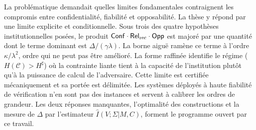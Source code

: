 \begin{sloppypar}
La probl\'ematique demandait quelles limites fondamentales contraignent les compromis entre
confidentialit\'e, fiabilit\'e et opposabilit\'e. La th\`ese y r\'epond par une limite explicite
et conditionnelle. Sous trois des quatre hypoth\`eses institutionnelles pos\'ees, le produit
$\mathsf{Conf} \cdot \mathsf{Rel}_{\mathrm{rec}} \cdot \mathsf{Opp}$ est major\'e par une quantit\'e dont le terme dominant est
$\Delta/(\gamma\lambda)$. La borne aigu\"e ram\`ene ce terme \`a l'ordre $\kappa/\lambda^2$, ordre
qui ne peut pas \^etre am\'elior\'e. La forme raffin\'ee identifie le r\'egime
($H(\mathcal{C}) > H^\sharp$) o\`u la contrainte liante tient \`a la capacit\'e de l'institution plut\^ot qu'\`a la puissance de calcul
de l'adversaire. Cette limite est certifi\'ee m\'ecaniquement et sa
port\'ee est d\'elimit\'ee. Les syst\`emes d\'eploy\'es \`a haute fiabilit\'e de v\'erification
n'en sont pas des instances et servent \`a calibrer les ordres de grandeur. Les deux r\'eponses
manquantes, l'optimalit\'e des constructions et la mesure de $\Delta$ par l'estimateur
$\hat{I}(V;\Sigma|M,C)$, forment le programme ouvert par ce travail.

\end{sloppypar}

